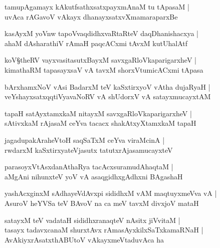 \begin{shloka}
tamupAgamayx kAkutfsathxsatxpayxmAnaM tu tApasaM |\\
uvAca rAGavoV vAkayx dhanayxsatxvXmamaraparxBe
\end{shloka}

\begin{shloka}
kasAyxM yoVnw tapoVvaqdidhxvaRtaRteV daqDhanishacxya |\\
ahaM dAsharathiV rAmaH paqcACxmi tAvxM kutUhalAtf
\end{shloka}

\begin{shloka}
koV\S theRV vayxvasitasutxBayxM savxgaRloVkaparigarxheV |\\
kimathaRM tapasayxsaV vA tavxM shorxVtumicACxmi tApasa 
\end{shloka}

\begin{shloka}
bArxhamxNoV vAsi BadarxM teV kaSxtirxyoV vAtha dujaRyaH |\\
veYshayxsatxqqtiVyavaNoRV vA shUdorxV vA satayxmucayxtAM 
\end{shloka}

\begin{shloka}
tapaH satAyxtamxkaM nitayxM savxgaRloVkaparigarxheV |\\
sAtivxkaM rAjasaM ceYva tacacx shakAtxyXtamxkaM tapaH 
\end{shloka}

\begin{shloka}
jagadupakAraheVtoH saqSaTxM ceYva viraMcinA |\\
rwdarxM kaSxtirxyateVjasutx tatutxrAjasamucayxteV 
\end{shloka}

\begin{shloka}
parasoyxVtAsxdanAthaRya tacAcxsuramudAhaqtaM |\\
aMgAni nihunxteV yoV vA asaqgidhxgAdhxni BAgashaH 
\end{shloka}

\begin{shloka}
yashAcxginxM sAdhayeVdAvxpi sididhxM vAM maqtuyxmeVva vA |\\
AsuroV heYVSa teV BAvoV na ca meV tavxM divxjoV mataH 
\end{shloka}

\begin{shloka}
satayxM teV vadataH sididhxranaqteV nAsitx jiVvitaM |\\
tasayx tadavxcanaM shurxtAvx rAmasAyxkilxSaTxkamaRNaH |\\
AvAkiyxrAsatxthABUtoV vAkayxmeVtaduvAca ha 
\end{shloka}

